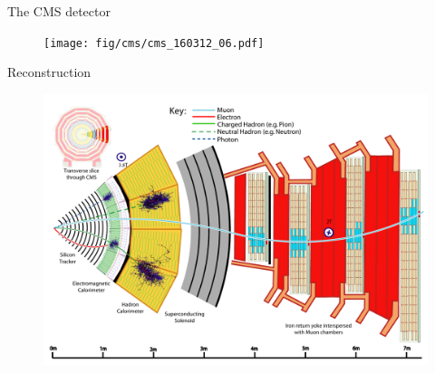 \begin{frame}[fragile]{The CMS detector}
  \begin{figure}[htpb]
    \centering
    \texttt{[image: fig/cms/cms\_160312\_06.pdf]}
  \end{figure}
\end{frame}

\begin{frame}[fragile]{Reconstruction}
  \begin{figure}[htpb]
    \centering
    \includegraphics[height=0.8\textheight]{fig/cms/CMS-PRF-14-001_Figure_001.pdf}
  \end{figure}
\end{frame}


